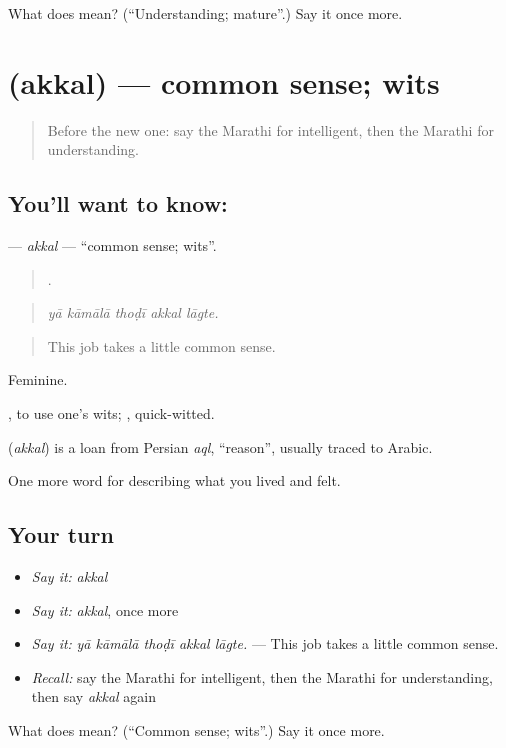 \begin{tcolorbox}[breakable,colback=teal!4,colframe=teal!35!black,title={Before you move on}]
What does  mean? (\textquotedblleft{}Understanding; mature\textquotedblright{}.) Say it once more.
\end{tcolorbox}
\section[\texorpdfstring{\mr{अक्कल} (akkal)}{अक्कल (akkal)}]{ (akkal) — common sense; wits}

\label{lesson:MR-C471-akkal}



\begin{quote}
Before the new one: say the Marathi for intelligent, then the Marathi for understanding.
\end{quote}

\subsection*{You'll want to know: }
\textbf{} — \emph{akkal} — \textquotedblleft{}common sense; wits\textquotedblright{}.

\begin{quote}
    .
\end{quote}

\begin{quote}
\emph{yā kāmālā thoḍī akkal lāgte.}
\end{quote}

\begin{quote}
This job takes a little common sense.
\end{quote}

Feminine.

 , to use one's wits; , quick-witted.

\begin{cousinweb}
\textbf{} (\emph{akkal}) is a loan from Persian \emph{aql}, \textquotedblleft{}reason\textquotedblright{}, usually traced to Arabic.
\end{cousinweb}

\begin{grammarlens}[title={What you've built}]
One more word for describing what you lived and felt.
\end{grammarlens}

\subsection*{Your turn}
\begin{itemize}
\raggedright
  \item \emph{Say it:} \emph{akkal}
  \item \emph{Say it:} \emph{akkal}, once more
  \item \emph{Say it:} \emph{yā kāmālā thoḍī akkal lāgte.} — This job takes a little common sense.
  \item \emph{Recall:} say the Marathi for intelligent, then the Marathi for understanding, then say \emph{akkal} again
\end{itemize}

\begin{tcolorbox}[breakable,colback=teal!4,colframe=teal!35!black,title={Before you move on}]
What does  mean? (\textquotedblleft{}Common sense; wits\textquotedblright{}.) Say it once more.
\end{tcolorbox}
